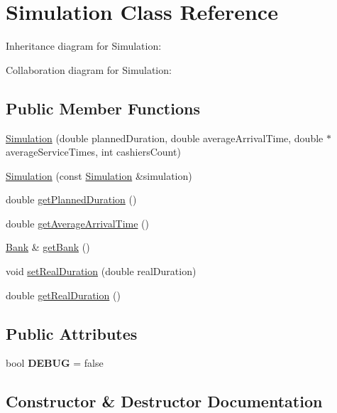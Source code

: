 \hypertarget{classSimulation}{}\section{Simulation Class Reference}
\label{classSimulation}


Inheritance diagram for Simulation\+:


Collaboration diagram for Simulation\+:
\subsection*{Public Member Functions}
\begin{DoxyCompactItemize}
\item 
\hyperlink{classSimulation_a4709539e1e5ef724442ba1484d4a9ab8}{Simulation} (double planned\+Duration, double average\+Arrival\+Time, double $\ast$average\+Service\+Times, int cashiers\+Count)
\item 
\hyperlink{classSimulation_ad82aba6067f881a5c364ea6b6b317325}{Simulation} (const \hyperlink{classSimulation}{Simulation} \&simulation)
\item 
double \hyperlink{classSimulation_a242c58ccefca3705bdc47ee7827c24fe}{get\+Planned\+Duration} ()
\item 
double \hyperlink{classSimulation_a1e4f97c6011a0cbce91c5034c917ab46}{get\+Average\+Arrival\+Time} ()
\item 
\hyperlink{classBank}{Bank} \& \hyperlink{classSimulation_a280ef124f9f6395a446b36a9dd45e4bc}{get\+Bank} ()
\item 
void \hyperlink{classSimulation_af7d8147539e8ea62f83c44fa0431e27d}{set\+Real\+Duration} (double real\+Duration)
\item 
double \hyperlink{classSimulation_a18218154310af27c087def0936690346}{get\+Real\+Duration} ()
\end{DoxyCompactItemize}
\subsection*{Public Attributes}
\begin{DoxyCompactItemize}
\item 
\mbox{\label{classSimulation_ae125e30e669048458632583d63c6683e}} 
bool {\bfseries D\+E\+B\+UG} = false
\end{DoxyCompactItemize}


\subsection{Constructor \& Destructor Documentation}
\mbox{\label{classSimulation_a4709539e1e5ef724442ba1484d4a9ab8}} 
